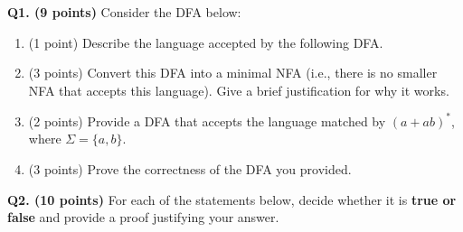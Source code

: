 \documentclass{article}
\begin{document}
    \noindent\textbf{Q1. (9 points)} Consider the DFA below:
    \begin{center}
    \end{center}
    \begin{enumerate}[label=\alph*)]
        \item (1 point) Describe the language accepted by the following DFA.

        \item (3 points) Convert this DFA into a minimal NFA (i.e., there is no smaller NFA that accepts this language). Give a brief justification for why it works.
        
        \pagebreak

        \item  (2 points) Provide a DFA that accepts the language matched by \((a+ab)^*\), where \(\Sigma = \{a, b\}\).
        \vfill
        \item (3 points) Prove the correctness of the DFA you provided.
        \vfill
    \end{enumerate}

    \pagebreak

    \noindent\textbf{Q2. (10 points)} For each of the statements below, decide whether it is \textbf{true or false} and provide a proof justifying your answer.
\end{document}
